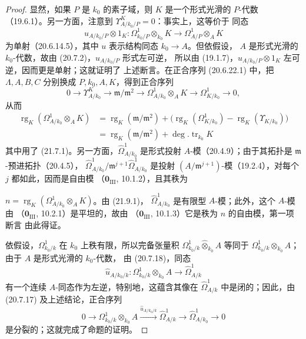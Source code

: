 \begin{proof}
显然，如果 $P$ 是 $k_0$ 的素子域，则 $K$ 是一个形式光滑的 $P$-代数
（19.6.1）。另一方面，注意到 $\Upsilon^K_{A/k_0/P}=0$：事实上，这等价于
同态
\[
  u_{A/k_0/P}\otimes1_K:
  \Omega^1_{k_0/P}\otimes_{k_0}K
  \longrightarrow \Omega^1_{A/P}\otimes_A K
\]
为单射（20.6.14.5），其中 $u$ 表示结构同态 $k_0\to A$。但依假设，
$A$ 是形式光滑的 $k_0$-代数，故由 (20.7.2)，$u_{A/k_0/P}$ 形式左可逆，
所以由 (19.1.7)，$u_{A/k_0/P}\otimes1_K$ 左可逆，因而更是单射；这就证明了
上述断言。在正合序列 (20.6.22.1) 中，把 $\Lambda,A,B,C$ 分别换成
$P,k_0,A,K$，得到正合序列
\[
  0\longrightarrow \Upsilon^K_{A/k_0}
  \longrightarrow \mathfrak m/\mathfrak m^2
  \longrightarrow \Omega^1_{A/k_0}\otimes_A K
  \longrightarrow \Omega^1_{K/k_0}\longrightarrow0,
\]
从而
\[
\begin{split}
  \operatorname{rg}_K(\Omega^1_{A/k_0}\otimes_AK)
  &={\operatorname{rg}}_K(\mathfrak m/\mathfrak m^2)
    +\bigl(\operatorname{rg}_K(\Omega^1_{K/k_0})
    -\operatorname{rg}_K(\Upsilon_{K/k_0})\bigr)\\
  &={\operatorname{rg}}_K(\mathfrak m/\mathfrak m^2)
    +\deg.\operatorname{tr}_{k_0}K
\end{split}
\]
其中用了 (21.7.1)。另一方面，$\widehat\Omega^1_{A/k_0}$ 是形式投射
$A$-模（20.4.9）；由于其拓扑是 $\mathfrak m$-预进拓扑（20.4.5），
$\widehat\Omega^1_{A/k_0}/\mathfrak m^{j+1}\widehat\Omega^1_{A/k_0}$ 是投射
$(A/\mathfrak m^{j+1})$-模（19.2.4），对每个 $j$ 都如此，因而是自由模
（$\mathbf 0_{\mathrm{III}}$, 10.1.2），且其秩为

$n=\operatorname{rg}_K(\Omega^1_{A/k_0}\otimes_AK)$。由 (21.9.1)，
$\widehat\Omega^1_{A/k_0}$ 是有限型 $A$-模；此外，这个 $A$-模由
（$\mathbf 0_{\mathrm{III}}$, 10.2.1）是平坦的，故由
（$\mathbf 0_{\mathrm{III}}$, 10.1.3）它是秩为 $n$ 的自由模，第一项断言
由此得证。

依假设，$\Omega^1_{k_0/k}$ 在 $k_0$ 上秩有限，所以完备张量积
$\Omega^1_{k_0/k}\widehat\otimes_{k_0}A$ 等同于
$\Omega^1_{k_0/k}\otimes_{k_0}A$；由于 $A$ 是形式光滑的 $k_0$-代数，
由 (20.7.18)，同态
\[
  \widehat u_{A/k_0/k}:
  \Omega^1_{k_0/k}\otimes_{k_0}A
  \longrightarrow\widehat\Omega^1_{A/k}
\]
有一个连续 $A$-同态作为左逆，特别地，这蕴含其像在
$\widehat\Omega^1_{A/k}$ 中是闭的；因此，由 (20.7.17) 及上述结论，正合序列
\[
  0\longrightarrow \Omega^1_{k_0/k}\otimes_{k_0}A
  \xrightarrow{\widehat u_{A/k_0/k}}\widehat\Omega^1_{A/k}
  \longrightarrow\widehat\Omega^1_{A/k_0}\longrightarrow0
\]
是分裂的；这就完成了命题的证明。
\end{proof}

